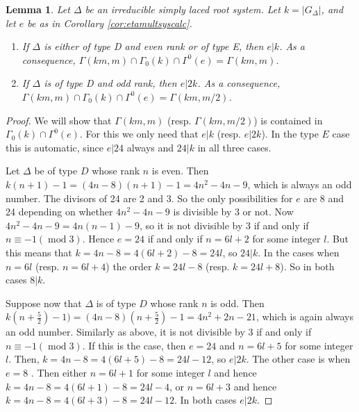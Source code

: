 \documentclass[11pt,a4paper]{amsart}
\newtheorem{lemma}[theorem]{Lemma}
\theoremstyle{definition}
\begin{document}
\begin{lemma} 
\label{lem:grpint}
Let $\Delta$ be an irreducible simply laced root system. Let $k=|G_{\Delta}|$, and let $e$ be as in Corollary \ref{cor:etamultsyscalc}. 
\begin{enumerate}
\item If $\Delta$ is either of type D and even rank or of type E, then $e|k$. As a consequence, $\Gamma(km,m) \cap \Gamma_0(k) \cap \Gamma^0(e)=\Gamma(km,m)$.
\item If $\Delta$ is of type D and odd rank, then $e|2k$. As a consequence, $\Gamma(km,m) \cap \Gamma_0(k) \cap \Gamma^0(e)=\Gamma(km,m/2)$.
\end{enumerate}
\end{lemma}
\begin{proof}
We will show that $\Gamma(km,m)$ (resp. $\Gamma(km,m/2)$) is contained in $\Gamma_0(k) \cap \Gamma^0(e)$. For this we only need that $e|k$ (resp. $e|2k$). In the type $E$ case this is automatic, since $e|24$ always and $24|k$ in all three cases.

Let $\Delta$ be of type $D$ whose rank $n$ is even. Then $k(n+1)-1=(4n-8)(n+1)-1=4n^2-4n-9$, which is always an odd number. The divisors of 24 are 2 and 3. So the only possibilities for $e$ are 8 and 24 depending on whether $4n^2-4n-9$ is divisible by 3 or not. Now $4n^2-4n-9=4n(n-1)-9$, so it is not divisible by 3 if and only if $n \equiv -1 (\; \mathrm{mod}\; 3)$. Hence $e=24$ if and only if $n=6l+2$ for some integer $l$. But this means that $k=4n-8=4(6l+2)-8=24l$, so $24|k$. In the cases when $n=6l$ (resp. $n=6l+4$) the order $k=24l-8$ (resp. $k=24l+8$). So in both cases $8|k$. 

Suppose now that $\Delta$ is of type $D$ whose rank $n$ is odd. Then $k(n+\frac{5}{2})-1)=(4n-8)(n+\frac{5}{2})-1=4n^2+2n-21$, which is again always an odd number. Similarly as above, it is not divisible by 3 if and only if $n \equiv -1 (\; \mathrm{mod}\; 3)$.
If this is the case, then $e=24$ and $n=6l+5$ for some integer $l$. Then, $k=4n-8=4(6l+5)-8=24l-12$, so $e|2k$.
The other case is when $e=8$ . Then either $n=6l+1$ for some integer $l$ and hence $k=4n-8=4(6l+1)-8=24l-4$, or $n=6l+3$ and hence $k=4n-8=4(6l+3)-8=24l-12$. In both cases $e|2k$.
\end{proof}
\end{document}
